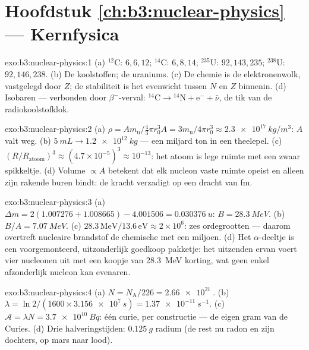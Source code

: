 \section*{Hoofdstuk \ref{ch:b3:nuclear-physics} --- Kernfysica}

\begin{solution}{exo:b3:nuclear-physics:1}
(a) $^{12}$C: $6, 6, 12$; $^{14}$C: $6, 8, 14$; $^{235}$U:
$92, 143, 235$; $^{238}$U: $92, 146, 238$. (b) De koolstoffen; de
uraniums. (c) De chemie is de elektronenwolk, vastgelegd door $Z$;
de stabiliteit is het evenwicht tussen $N$ en $Z$ binnenin. (d) Isobaren ---
verbonden door $\beta^-$-verval: $^{14}\text{C} \to {}^{14}\text{N}
+ \text{e}^- + \bar\nu$, de tik van de radiokoolstofklok.
\end{solution}

\begin{solution}{exo:b3:nuclear-physics:2}
(a) $\rho = Am_{\text{u}}/\tfrac43\pi r_0^3A =
3m_{\text{u}}/4\pi r_0^3 \approx \qty{2.3e17}{kg/m^3}$: $A$
valt weg. (b) $\qty{5}{mL} \to \qty{1.2e12}{kg}$ --- een miljard
ton in een theelepel. (c) $(R/R_{\text{atoom}})^3 \approx
(4.7\times10^{-5})^3 \approx 10^{-13}$: het atoom is lege ruimte
met een zwaar spikkeltje. (d) Volume $\propto A$ betekent dat elk nucleon
vaste ruimte opeist en alleen zijn rakende buren bindt: de
kracht verzadigt op een dracht van \unit{fm}.
\end{solution}

\begin{solution}{exo:b3:nuclear-physics:3}
(a) $\Delta m = 2(1.007276 + 1.008665) - 4.001506 =
\qty{0.030376}{u}$: $B = \qty{28.3}{MeV}$. (b) $B/A =
\qty{7.07}{MeV}$. (c) $28.3\,\text{MeV}/13.6\,\text{eV} \approx
2\times10^6$: zes ordegrootten --- daarom overtreft nucleaire brandstof
de chemische met een miljoen. (d) Het $\alpha$-deeltje is een
voorgemonteerd, uitzonderlijk goedkoop pakketje: het uitzenden ervan voert
vier nucleonen uit met een koopje van \qty{28.3}{MeV} korting, wat geen
enkel afzonderlijk nucleon kan evenaren.
\end{solution}

\begin{solution}{exo:b3:nuclear-physics:4}
(a) $N = N_{\text{A}}/226 = \qty{2.66e21}{}$. (b) $\lambda =
\ln2/(1600\times\qty{3.156e7}{s}) = \qty{1.37e-11}{s^{-1}}$. (c)
$\mathcal A = \lambda N = \qty{3.7e10}{Bq}$: één curie, per
constructie --- de eigen gram van de Curies. (d) Drie halveringstijden:
$\qty{0.125}{g}$ radium (de rest nu radon en zijn
dochters, op mars naar lood).
\end{solution}

